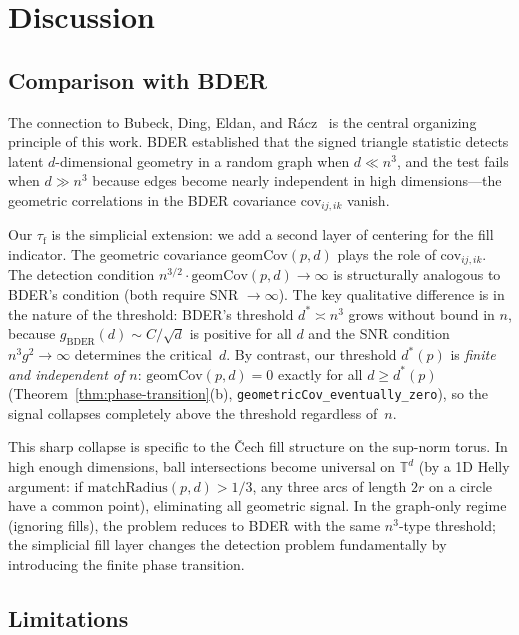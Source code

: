 \documentclass[reqno,12pt]{amsart}
\newcommand{\tauf}{\tau_{\mathrm{f}}}
\newcommand{\geomCov}{\mathrm{geomCov}}
\newcommand{\matchR}{\mathrm{matchRadius}}
\newcommand{\TT}{\mathbb{T}}         %
\newcommand{\lean}[1]{\textup{\texttt{\small #1}}}
\theoremstyle{plain}
\theoremstyle{definition}
\theoremstyle{remark}
\begin{document}
\section{Discussion}\label{sec:discussion}

\subsection{Comparison with BDER}

The connection to Bubeck, Ding, Eldan, and R\'acz~\cite{Bubeck2016} is the central organizing
principle of this work. BDER established that the signed triangle statistic detects latent
$d$-dimensional geometry in a random graph when $d\ll n^3$, and the test fails when $d\gg n^3$
because edges become nearly independent in high dimensions---the geometric correlations in the
BDER covariance $\mathrm{cov}_{ij,ik}$ vanish.

Our $\tauf$ is the simplicial extension: we add a second layer of centering for the fill
indicator. The geometric covariance $\geomCov(p,d)$ plays the role of $\mathrm{cov}_{ij,ik}$.
The detection condition $n^{3/2}\cdot\geomCov(p,d)\to\infty$ is structurally analogous to
BDER's condition (both require SNR $\to\infty$). The key qualitative difference is in
the nature of the threshold: BDER's threshold $d^*\asymp n^3$ grows without bound in $n$,
because $g_\mathrm{BDER}(d)\sim C/\sqrt{d}$ is positive for all $d$ and the SNR condition
$n^3 g^2\to\infty$ determines the critical~$d$. By contrast, our threshold $d^*(p)$ is
\emph{finite and independent of $n$}: $\geomCov(p,d) = 0$ exactly for all $d \geq d^*(p)$
(Theorem~\ref{thm:phase-transition}(b), \lean{geometricCov\_eventually\_zero}), so the
signal collapses completely above the threshold regardless of~$n$.

This sharp collapse is specific to the Čech fill structure on the sup-norm torus. In high
enough dimensions, ball intersections become universal on $\TT^d$ (by a 1D Helly
argument: if $\matchR(p,d) > 1/3$, any three arcs of length $2r$ on a circle have a common
point), eliminating all geometric signal. In the graph-only regime (ignoring fills), the
problem reduces to BDER with the same $n^3$-type threshold; the simplicial fill layer
changes the detection problem fundamentally by introducing the finite phase transition.

\subsection{Limitations}
\end{document}
